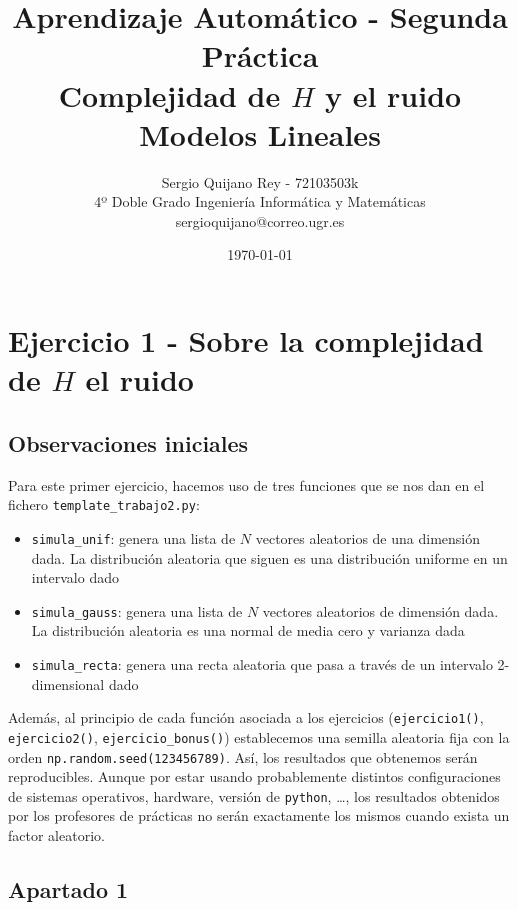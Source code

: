 \documentclass[11pt]{article}
\title{
    {Aprendizaje Automático - Segunda Práctica}\\
    {Complejidad de $H$ y el ruido}\\
    {Modelos Lineales}
}
\author{
    {Sergio Quijano Rey - 72103503k}\\
    {4º Doble Grado Ingeniería Informática y Matemáticas}\\
    {sergioquijano@correo.ugr.es}
}
\date{\today}
\begin{document}
\maketitle
\pagebreak

\tableofcontents

\listoffigures




\pagebreak

\section{Ejercicio 1 - Sobre la complejidad de $H$ el ruido}

\subsection{Observaciones iniciales}

Para este primer ejercicio, hacemos uso de tres funciones que se nos dan en el fichero \lstinline{template_trabajo2.py}:

\begin{itemize}
    \item \lstinline{simula_unif}: genera una lista de $N$ vectores aleatorios de una dimensión dada. La distribución aleatoria que siguen es una distribución uniforme en un intervalo dado
    \item \lstinline{simula_gauss}: genera una lista de $N$ vectores aleatorios de dimensión dada. La distribución aleatoria es una normal de media cero y varianza dada
    \item \lstinline{simula_recta}: genera una recta aleatoria que pasa a través de un intervalo 2-dimensional dado
\end{itemize}

Además, al principio de cada función asociada a los ejercicios (\lstinline{ejercicio1()}, \lstinline{ejercicio2()}, \lstinline{ejercicio_bonus()}) establecemos una semilla aleatoria fija con la orden \lstinline{np.random.seed(123456789)}. Así, los resultados que obtenemos serán reproducibles. Aunque por estar usando probablemente distintos configuraciones de sistemas operativos, hardware, versión de \lstinline{python}, \ldots, los resultados obtenidos por los profesores de prácticas no serán exactamente los mismos cuando exista un factor aleatorio.

\subsection{Apartado 1}
\end{document}
